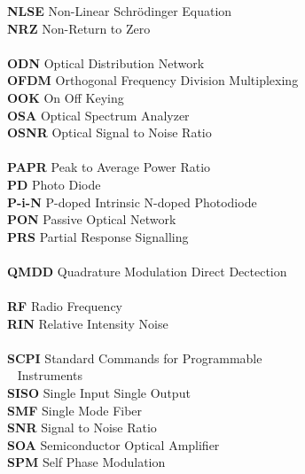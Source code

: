 \begin{multicols}{2}
\begin{tabbing}
\textbf{NLSE}		\>	Non-Linear Schr\"{o}dinger Equation				\\
\textbf{NRZ}		\>	Non-Return to Zero								\\
\\
\textbf{ODN}		\>	Optical Distribution Network					\\
\textbf{OFDM}		\>	Orthogonal Frequency Division Multiplexing		\\
\textbf{OOK}		\>	On Off Keying									\\
\textbf{OSA}		\>	Optical Spectrum Analyzer						\\
\textbf{OSNR}		\>	Optical Signal to Noise Ratio					\\
\\
\textbf{PAPR}		\>	Peak to Average Power Ratio						\\
\textbf{PD}			\>	Photo Diode										\\
\textbf{P-i-N}		\>	P-doped Intrinsic N-doped Photodiode			\\
\textbf{PON}		\>	Passive Optical Network							\\
\textbf{PRS}		\>	Partial Response Signalling						\\
\\
\textbf{QMDD}		\>	Quadrature Modulation Direct Dectection			\\
\\
\textbf{RF}			\>	Radio Frequency									\\
\textbf{RIN}		\>	Relative Intensity Noise						\\
\\
\textbf{SCPI}		\>	Standard Commands for Programmable					\\
~			\>	Instruments								\\
\textbf{SISO}		\>	Single Input Single Output						\\
\textbf{SMF}		\>	Single Mode Fiber								\\
\textbf{SNR}		\>	Signal to Noise Ratio							\\
\textbf{SOA}		\>	Semiconductor Optical Amplifier					\\
\textbf{SPM}		\>	Self Phase Modulation							\\

\end{tabbing}
\end{multicols}
